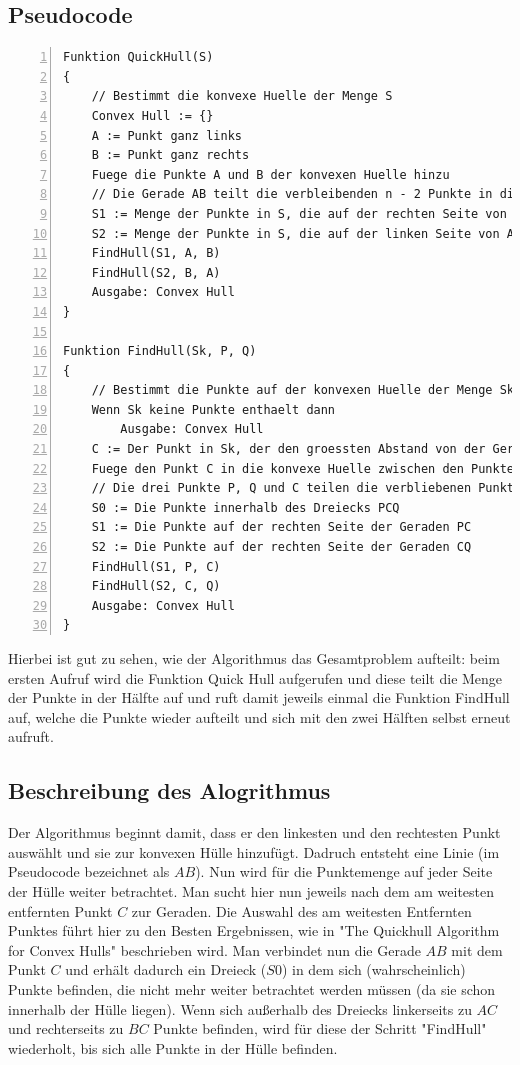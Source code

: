 \documentclass[Labor, MSC, german]{twbook}
\begin{document}
\subsection{Pseudocode}
\begin{lstlisting}[language=PseudoCode,numbers=left, breaklines=true, caption={Quick Hull Pseudocode \cite{Wikipedia_QuickHull}}]
Funktion QuickHull(S)
{
    // Bestimmt die konvexe Huelle der Menge S
    Convex Hull := {} 
    A := Punkt ganz links
    B := Punkt ganz rechts
    Fuege die Punkte A und B der konvexen Huelle hinzu
    // Die Gerade AB teilt die verbleibenden n - 2 Punkte in die Teilmengen S1 und S2
    S1 := Menge der Punkte in S, die auf der rechten Seite von AB sind
    S2 := Menge der Punkte in S, die auf der linken Seite von AB sind
    FindHull(S1, A, B)
    FindHull(S2, B, A)
    Ausgabe: Convex Hull
}

Funktion FindHull(Sk, P, Q)
{
    // Bestimmt die Punkte auf der konvexen Huelle der Menge Sk, die auf der rechten Seite der Geraden PQ sind
    Wenn Sk keine Punkte enthaelt dann
        Ausgabe: Convex Hull
    C := Der Punkt in Sk, der den groessten Abstand von der Geraden PQ hat
    Fuege den Punkt C in die konvexe Huelle zwischen den Punkten P und Q ein
    // Die drei Punkte P, Q und C teilen die verbliebenen Punkte von Sk in die Teilmengen S0, S1 und S2
    S0 := Die Punkte innerhalb des Dreiecks PCQ
    S1 := Die Punkte auf der rechten Seite der Geraden PC
    S2 := Die Punkte auf der rechten Seite der Geraden CQ
    FindHull(S1, P, C)
    FindHull(S2, C, Q)
    Ausgabe: Convex Hull
}
\end{lstlisting}
Hierbei ist gut zu sehen, wie der Algorithmus das Gesamtproblem aufteilt: beim ersten Aufruf wird die Funktion Quick Hull aufgerufen und diese teilt die Menge der Punkte in der Hälfte auf und ruft damit jeweils einmal die Funktion FindHull auf, welche die Punkte wieder aufteilt und sich mit den zwei Hälften selbst erneut aufruft.
\subsection{Beschreibung des Alogrithmus}
Der Algorithmus beginnt damit, dass er den linkesten und den rechtesten Punkt auswählt und sie zur konvexen Hülle hinzufügt. Dadruch entsteht eine Linie (im Pseudocode bezeichnet als $AB$). Nun wird für die Punktemenge auf jeder Seite der Hülle weiter betrachtet. Man sucht hier nun jeweils nach dem am weitesten entfernten Punkt $C$ zur Geraden. Die Auswahl des am weitesten Entfernten Punktes führt hier zu den Besten Ergebnissen, wie in "The Quickhull Algorithm for Convex Hulls"\cite{10.1145/235815.235821} beschrieben wird. Man verbindet nun die Gerade $AB$ mit dem Punkt $C$ und erhält dadurch ein Dreieck ($S0$) in dem sich (wahrscheinlich) Punkte befinden, die nicht mehr weiter betrachtet werden müssen (da sie schon innerhalb der Hülle liegen). Wenn sich außerhalb des Dreiecks linkerseits zu $AC$ und rechterseits zu $BC$ Punkte befinden, wird für diese der Schritt "FindHull" wiederholt, bis sich alle Punkte in der Hülle befinden.
\end{document}
